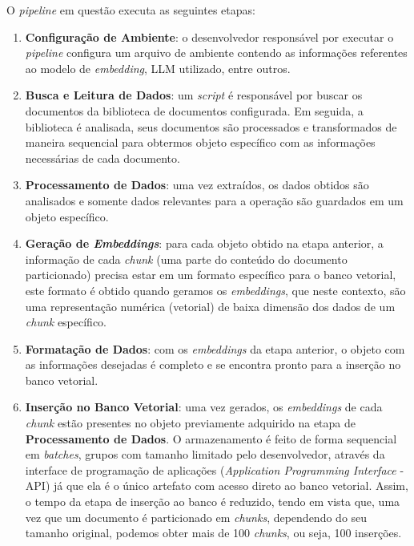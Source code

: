\documentclass[a4paper, 12pt]{article}
\begin{document}
    O \textit{pipeline} em questão executa as seguintes etapas: 
    
    \begin{enumerate}
        \item \textbf{Configuração de Ambiente}: o desenvolvedor responsável por executar o \textit{pipeline} configura um arquivo de ambiente contendo as informações referentes ao modelo de \textit{embedding}, LLM utilizado, entre outros.
        \item \textbf{Busca e Leitura de Dados}: um \textit{script} é responsável por buscar os documentos da biblioteca de documentos configurada. Em seguida, a biblioteca é analisada, seus documentos são processados e transformados de maneira sequencial para obtermos objeto específico com as informações necessárias de cada documento.
        \item \textbf{Processamento de Dados}: uma vez extraídos, os dados obtidos são analisados e somente dados relevantes para a operação são guardados em um objeto específico.
        \item \textbf{Geração de \textit{Embeddings}}: para cada objeto obtido na etapa anterior, a informação de cada \textit{chunk} (uma parte do conteúdo do documento particionado) precisa estar em um formato específico para o banco vetorial, este formato é obtido quando geramos os \textit{embeddings}, que neste contexto, são uma representação numérica (vetorial) de baixa dimensão dos dados de um \textit{chunk} específico.
        \item \textbf{Formatação de Dados}: com os \textit{embeddings} da etapa anterior, o objeto com as informações desejadas é completo e se encontra pronto para a inserção no banco vetorial.
        \item \textbf{Inserção no Banco Vetorial}: uma vez gerados, os \textit{embeddings} de cada \textit{chunk} estão presentes no objeto previamente adquirido na etapa de \textbf{Processamento de Dados}. O armazenamento é feito de forma sequencial em \textit{batches}, grupos com tamanho limitado pelo desenvolvedor, através da interface de programação de aplicações (\textit{Application Programming Interface} - API) já que ela é o único artefato com acesso direto ao banco vetorial. Assim, o tempo da etapa de inserção ao banco é reduzido, tendo em vista que, uma vez que um documento é particionado em \textit{chunks}, dependendo do seu tamanho original, podemos obter mais de 100 \textit{chunks}, ou seja, 100 inserções.
    \end{enumerate}
    
\end{document}
